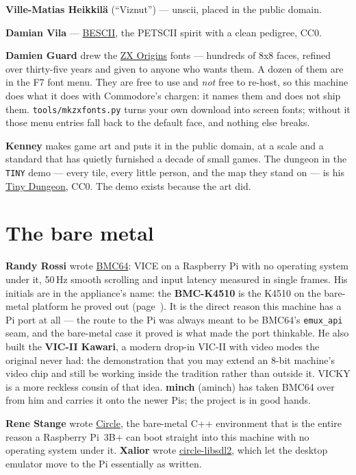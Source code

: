 \textbf{Ville-Matias Heikkilä} (``Viznut'') --- unscii, placed in the
public domain.

\textbf{Damian Vila} --- \href{https://codeberg.org/Dmian/font-bescii}{BESCII},
the PETSCII spirit with a clean pedigree, CC0.

\textbf{Damien Guard} drew the \href{https://damieng.com/zx-origins}{ZX
Origins} fonts --- hundreds of 8x8 faces, refined over thirty-five years
and given to anyone who wants them. A dozen of them are in the F7 font
menu. They are free to use and \emph{not} free to re-host, so this
machine does what it does with Commodore's chargen: it names them and
does not ship them. \verb|tools/mkzxfonts.py| turns your own download
into screen fonts; without it those menu entries fall back to the
default face, and nothing else breaks.

\textbf{Kenney} makes game art and puts it in the public domain, at a
scale and a standard that has quietly furnished a decade of small games.
The dungeon in the \verb|TINY| demo --- every tile, every little
person, and the map they stand on --- is his
\href{https://kenney.nl/assets/tiny-dungeon}{Tiny Dungeon}, CC0. The
demo exists because the art did.

\section{The bare metal}
\textbf{Randy Rossi} wrote
\href{https://github.com/randyrossi/bmc64}{BMC64}: VICE on a Raspberry
Pi with no operating system under it, 50\,Hz smooth scrolling and input
latency measured in single frames. His initials are in the appliance's
name: the \textbf{BMC-K4510} is the K4510 on the bare-metal platform he
proved out (page~\pageref{sec:names}). It is the direct reason this
machine has a Pi port at all --- the route to the Pi was always meant to be
BMC64's \verb|emux_api| seam, and the bare-metal case it proved is what
made the port thinkable. He also built the \textbf{VIC-II Kawari}, a
modern drop-in VIC-II with video modes the original never had: the
demonstration that you may extend an 8-bit machine's video chip and
still be working inside the tradition rather than outside it. VICKY is
a more reckless cousin of that idea. \textbf{minch} (aminch) has taken
BMC64 over from him and carries it onto the newer Pis; the project is
in good hands.

\textbf{Rene Stange} wrote \href{https://github.com/rsta2/circle}{Circle},
the bare-metal C++ environment that is the entire reason a Raspberry
Pi~3B+ can boot straight into this machine with no operating system
under it. \textbf{Xalior} wrote
\href{https://github.com/Xalior/circle-libsdl2}{circle-libsdl2}, which
let the desktop emulator move to the Pi essentially as written.

